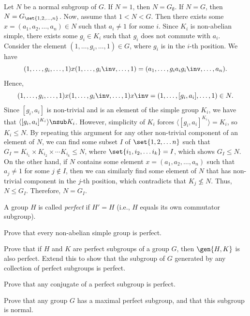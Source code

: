 \begin{sol}
    Let $N$ be a normal subgroup of $G$. If $N = 1$, then $N = G_\emptyset$. If $N = G$, then $N = G_{\set{1, 2, \ldots, n}}$. Now, assume that $1 < N < G$. Then there exists some $x = (a_1, a_2, \ldots, a_n) \in N$ such that $a_i \neq 1$ for some $i$. Since $K_i$ is non-abelian simple, there exists some $g_i \in K_i$ such that $g_i$ does not commute with $a_i$. Consider the element $(1, \ldots, g_i, \ldots, 1) \in G$, where $g_i$ is in the $i$-th position. We have
    \[(1, \ldots, g_i, \ldots, 1) x (1, \ldots, g_i\inv, \ldots, 1) = (a_1, \ldots, g_i a_i g_i\inv, \ldots, a_n).\]
    Hence,
    \[(1, \ldots, g_i, \ldots, 1) x (1, \ldots, g_i\inv, \ldots, 1) x\inv = (1, \ldots, [g_i, a_i], \ldots, 1) \in N.\]
    Since $[g_i, a_i]$ is non-trivial and is an element of the simple group $K_i$, we have that $\langle [g_i, a_i]^{K_i} \rangle \nsub K_i$. However, simplicity of $K_i$ forces $\langle [g_i, a_i]^{K_i} \rangle = K_i$, so $K_i \leq N$. By repeating this argument for any other non-trivial component of an element of $N$, we can find some subset $I$ of $\set{1, 2, \ldots n}$ such that $G_I = K_{i_1} \times K_{i_2} \times \cdots K_{i_k} \leq N$, where $\set{i_1, i_2, \ldots i_k} = I$, which shows $G_I \leq N$. On the other hand, if $N$ contains some element $x = (a_1, a_2, \ldots, a_n)$ such that $a_j \neq 1$ for some $j \notin I$, then we can similarly find some element of $N$ that has non-trivial component in the $j$-th position, which contradicts that $K_j \not\leq N$. Thus, $N \leq G_I$. Therefore, $N = G_I$.
\end{sol}

\begin{exercise}\label{ex5.4.19}
    A group $H$ is called \emph{perfect} if $H' = H$ (i.e., $H$ equals its own commutator subgroup).
    \begin{subproblems}
        \item Prove that every non-abelian simple group is perfect.
        \item Prove that if $H$ and $K$ are perfect subgroups of a group $G$, then $\gen{H, K}$ is also perfect. Extend this to show that the subgroup of $G$ generated by any collection of perfect subgroups is perfect.
        \item Prove that any conjugate of a perfect subgroup is perfect.
        \item Prove that any group $G$ has a maximal perfect subgroup, and that this subgroup is normal.
    \end{subproblems}
\end{exercise}

